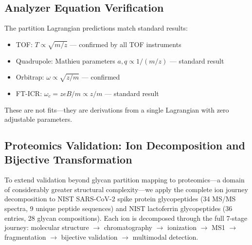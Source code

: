 \documentclass[twocolumn,10pt,a4paper]{article}
\theoremstyle{definition}
\theoremstyle{remark}
\begin{document}
\subsection{Analyzer Equation Verification}

The partition Lagrangian predictions match standard results:
\begin{itemize}
    \item TOF: $T \propto \sqrt{m/z}$ --- confirmed by all TOF instruments \citep{wiley1955}
    \item Quadrupole: Mathieu parameters $a, q \propto 1/(m/z)$ --- standard result \citep{paul1990}
    \item Orbitrap: $\omega \propto \sqrt{z/m}$ --- confirmed \citep{makarov2000}
    \item FT-ICR: $\omega_c = zeB/m \propto z/m$ --- standard result \citep{marshall1998}
\end{itemize}

These are not fits---they are derivations from a single Lagrangian with zero adjustable parameters.

\subsection{Proteomics Validation: Ion Decomposition and Bijective Transformation}
\label{sec:proteomics}

To extend validation beyond glycan partition mapping to proteomics---a domain of considerably greater structural complexity---we apply the complete ion journey decomposition to NIST SARS-CoV-2 spike protein glycopeptides (34 MS/MS spectra, 9 unique peptide sequences) and NIST lactoferrin glycopeptides (36 entries, 28 glycan compositions). Each ion is decomposed through the full 7-stage journey: molecular structure $\to$ chromatography $\to$ ionization $\to$ MS1 $\to$ fragmentation $\to$ bijective validation $\to$ multimodal detection.
\end{document}
